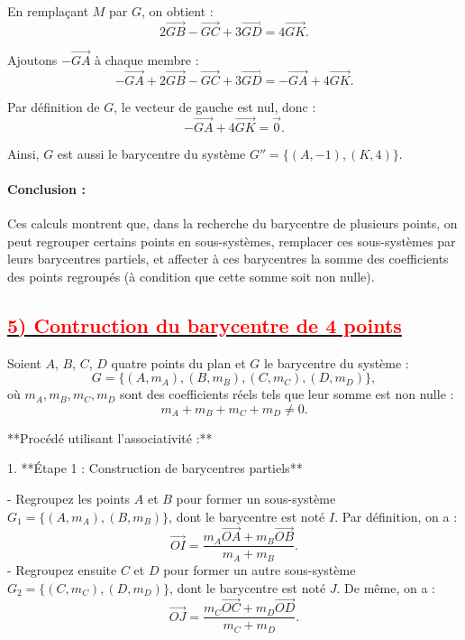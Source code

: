 \documentclass{article}
\begin{document}
En remplaçant \( M \) par \( G \), on obtient :  
\[
2\overrightarrow{GB} - \overrightarrow{GC} + 3\overrightarrow{GD} = 4\overrightarrow{GK}.
\]

Ajoutons \( -\overrightarrow{GA} \) à chaque membre :  
\[
-\overrightarrow{GA} + 2\overrightarrow{GB} - \overrightarrow{GC} + 3\overrightarrow{GD} = -\overrightarrow{GA} + 4\overrightarrow{GK}.
\]

Par définition de \( G \), le vecteur de gauche est nul, donc :  
\[
-\overrightarrow{GA} + 4\overrightarrow{GK} = \vec{0}.
\]

Ainsi, \( G \) est aussi le barycentre du système \( G'' = \{(A, -1), (K, 4)\} \).

\paragraph{Conclusion :}  
Ces calculs montrent que, dans la recherche du barycentre de plusieurs points, on peut regrouper certains points en sous-systèmes, remplacer ces sous-systèmes par leurs barycentres partiels, et affecter à ces barycentres la somme des coefficients des points regroupés (à condition que cette somme soit non nulle).

		
\subsection*{\underline{\textbf{\textcolor{red}{5) Contruction du barycentre de 4 points}}}}

Soient \( A \), \( B \), \( C \), \( D \) quatre points du plan et \( G \) le barycentre du système :  
\[
G = \{(A, m_A), (B, m_B), (C, m_C), (D, m_D)\},
\]
où \( m_A, m_B, m_C, m_D \) sont des coefficients réels tels que leur somme est non nulle :  
\[
m_A + m_B + m_C + m_D \neq 0.
\]

**Procédé utilisant l’associativité :**

1. **Étape 1 : Construction de barycentres partiels**
  
   - Regroupez les points \( A \) et \( B \) pour former un sous-système \( G_1 = \{(A, m_A), (B, m_B)\} \), dont le barycentre est noté \( I \).  
     Par définition, on a :  
     \[
     \overrightarrow{OI} = \frac{m_A \overrightarrow{OA} + m_B \overrightarrow{OB}}{m_A + m_B}.
     \]
   - Regroupez ensuite \( C \) et \( D \) pour former un autre sous-système \( G_2 = \{(C, m_C), (D, m_D)\} \), dont le barycentre est noté \( J \).  
     De même, on a :  
     \[
     \overrightarrow{OJ} = \frac{m_C \overrightarrow{OC} + m_D \overrightarrow{OD}}{m_C + m_D}.
     \]
\end{document}
